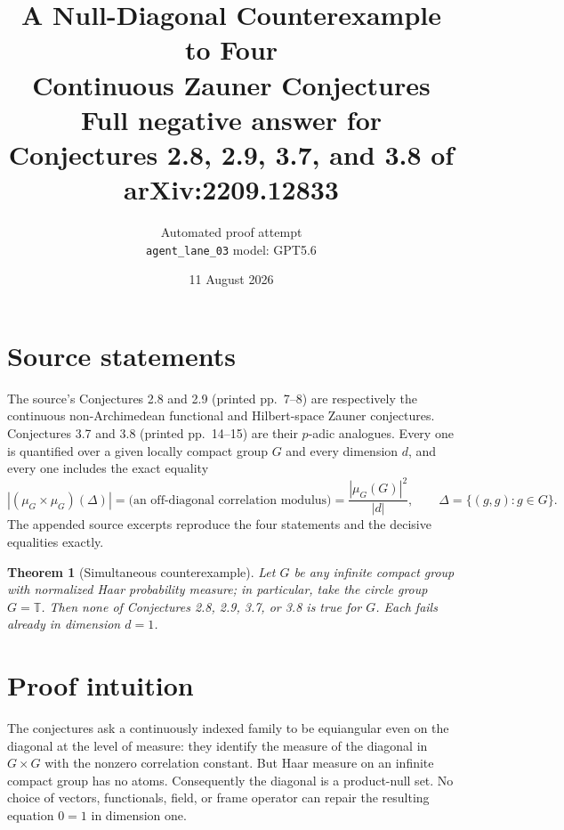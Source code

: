 \documentclass[10pt]{article}
\title{A Null-Diagonal Counterexample to Four\\Continuous Zauner Conjectures\\
\large Full negative answer for Conjectures 2.8, 2.9, 3.7, and 3.8 of arXiv:2209.12833}
\author{Automated proof attempt\\
\texttt{agent\_lane\_03} \quad model: GPT5.6}
\date{11 August 2026}
\newtheorem{theorem}{Theorem}
\newcommand{\T}{\mathbb T}
\begin{document}
\maketitle

\begin{center}
\end{center}

\section*{Source statements}

The source's Conjectures 2.8 and 2.9 (printed pp.~7--8) are respectively the
continuous non-Archimedean functional and Hilbert-space Zauner conjectures.
Conjectures 3.7 and 3.8 (printed pp.~14--15) are their \(p\)-adic analogues.
Every one is quantified over a given locally compact group \(G\) and every
dimension \(d\), and every one includes the exact equality
\begin{equation}\label{eq:source}
 |(\mu_G\times\mu_G)(\Delta)|
 =\text{(an off-diagonal correlation modulus)}
 =\frac{|\mu_G(G)|^2}{|d|},
 \qquad \Delta=\{(g,g):g\in G\}.
\end{equation}
The appended source excerpts reproduce the four statements and the decisive
equalities exactly.

\begin{theorem}[Simultaneous counterexample]\label{thm:counter}
Let \(G\) be any infinite compact group with normalized Haar probability
measure; in particular, take the circle group \(G=\T\).  Then none of
Conjectures 2.8, 2.9, 3.7, or 3.8 is true for \(G\).  Each fails already in
dimension \(d=1\).
\end{theorem}

\section*{Proof intuition}

The conjectures ask a continuously indexed family to be equiangular even on
the diagonal at the level of measure: they identify the measure of the
diagonal in \(G\times G\) with the nonzero correlation constant.  But Haar
measure on an infinite compact group has no atoms.  Consequently the diagonal
is a product-null set.  No choice of vectors, functionals, field, or frame
operator can repair the resulting equation \(0=1\) in dimension one.
\end{document}

